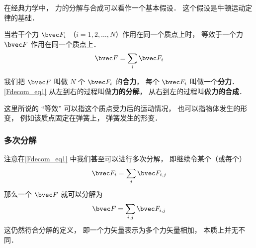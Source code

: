 

在经典力学中， 力的分解与合成可以看作一个基本假设． 这个假设是牛顿运动定律的基础．

当若干个力 $\bvec F_i$ （$i = 1, 2, \dots, N$）作用在同一个质点上时， 等效于一个力 $\bvec F$ 作用在同一个质点上．
\begin{equation}\label{Fdecom_eq1}
\bvec F = \sum_i \bvec F_i
\end{equation}

我们把 $\bvec F$ 叫做 $N$ 个 $\bvec F_i$ 的\textbf{合力}， 每个 $\bvec F_i$ 叫做一个\textbf{分力}． \autoref{Fdecom_eq1} 从左到右的过程叫做\textbf{力的分解}， 从右到左的过程叫做\textbf{力的合成}．

这里所说的 “等效” 可以指这个质点受力后的运动情况， 也可以指物体发生的形变， 例如该质点固定在弹簧上， 弹簧发生的形变．

\subsubsection{多次分解}
注意在\autoref{Fdecom_eq1} 中我们甚至可以进行多次分解， 即继续令某个（或每个）
\begin{equation}
\bvec F_i = \sum_j \bvec F_{i,j}
\end{equation}
那么一个 $\bvec F$ 就可以分解为
\begin{equation}
\bvec F = \sum_{i,j} \bvec F_{i,j}
\end{equation}
这仍然符合分解的定义， 即一个力矢量表示为多个力矢量相加， 本质上并无不同．
